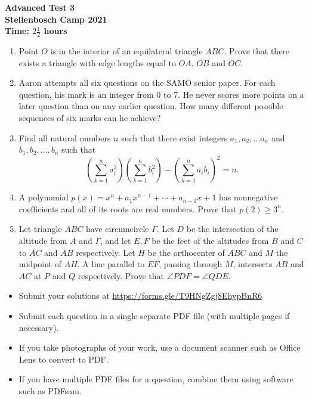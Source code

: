 \documentclass{article}
\begin{document}
\thispagestyle{empty}

\begin{center}
  \textbf{\Large Advanced Test 3}
  \\ \vspace{1em}
  \textbf{\large Stellenbosch Camp 2021}
  \\ \vspace{1em}
  \textbf{\large Time: $2\frac{1}{2}$ hours}
\end{center}

\bigskip

\begin{enumerate}[itemsep=\fill]

\item %
Point $O$ is in the interior of an equilateral triangle $ABC$. Prove that there exists a triangle with edge lengths equal to $OA$, $OB$ and $OC$.

\item %
Aaron attempts all six questions on the SAMO senior paper. For each question, his mark is an integer from 0 to 7. He never scores more points on a later question than on any earlier question. How many different possible sequences of six marks can he achieve? 


\item %
Find all natural numbers $n$ such that there exist integers $a_1, a_2, \dots a_n$ and $b_1, b_2, \dots, b_n$ such that
\[
  \left(\sum_{k = 1}^{n} a_i^2 \right)\left(\sum_{k = 1}^{n} b_i^2 \right) - {\left(\sum_{k = 1}^{n} a_i b_i \right)}^2 = n.
\]


\item %
A polynomial $p(x) = x^n +a_1 x^{n-1} +\dotsb +a_{n-1} x +1$ has nonnegative coefficients and all of its roots are real numbers.
Prove that $p(2) \geq 3^n$.


\item %
Let triangle $ABC$ have circumcircle $\Gamma$. Let $D$ be the intersection of the altitude from $A$ and $\Gamma$, and let $E,F$ be the feet of the altitudes from $B$ and $C$ to $AC$ and $AB$ respectively. Let $H$ be the orthocenter of $ABC$ and $M$ the midpoint of $AH$. A line parallel to $EF$, passing through $M$, intersects $AB$ and $AC$ at $P$ and $Q$ respectively. Prove that $\angle PDF = \angle QDE$.

\end{enumerate}


\vfill
\begin{itemize}
	\item Submit your solutions at \href{https://forms.gle/T9HNgZgj8EhypBnR6}{https://forms.gle/T9HNgZgj8EhypBnR6}
	\item Submit each question in a single separate PDF file (with multiple pages if necessary).
	\item If you take photographs of your work, use a document scanner such as Office Lens to convert to PDF.
	\item If you have multiple PDF files for a question, combine them using software such as PDFsam.
\end{itemize}
\end{document}
